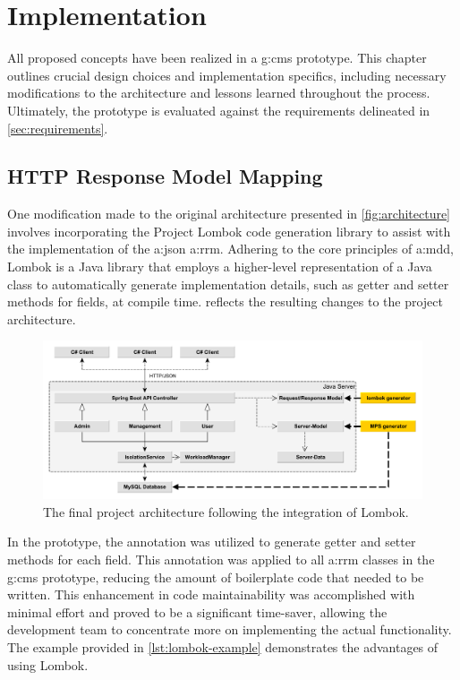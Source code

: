 \chapter{Implementation}
\label{ch:impl}

All proposed concepts have been realized in a \gls{g:cms} prototype. This chapter outlines crucial design choices and implementation specifics, including necessary modifications to the architecture and lessons learned throughout the process. Ultimately, the prototype is evaluated against the requirements delineated in \cref{sec:requirements}.

\section{HTTP Response Model Mapping}\label{sec:impl-lombok}

One modification made to the original architecture presented in \vref{fig:architecture} involves incorporating the Project Lombok code generation library to assist with the implementation of the \gls{a:json} \gls{a:rrm}. Adhering to the core principles of \gls{a:mdd}, Lombok is a Java library that employs a higher-level representation of a Java class to automatically generate implementation details, such as getter and setter methods for fields, at compile time.  reflects the resulting changes to the project architecture.

\begin{figure}[H]
\centering
\includegraphics[width=\textwidth]{images/big-picture}
\caption{The final project architecture following the integration of Lombok.}
\label{fig:architecture-with-lombok}
\end{figure}

In the prototype, the  annotation was utilized to generate getter and setter methods for each field. This annotation was applied to all \gls{a:rrm} classes in the \gls{g:cms} prototype, reducing the amount of boilerplate code that needed to be written. This enhancement in code maintainability was accomplished with minimal effort and proved to be a significant time-saver, allowing the development team to concentrate more on implementing the actual functionality. The example provided in \vref{lst:lombok-example} demonstrates the advantages of using Lombok.

